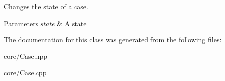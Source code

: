 Changes the state of a case. 


\begin{DoxyParams}{Parameters}
{\em state} & A state \\
\hline
\end{DoxyParams}


The documentation for this class was generated from the following files\+:\begin{DoxyCompactItemize}
\item 
core/Case.\+hpp\item 
core/Case.\+cpp\end{DoxyCompactItemize}
